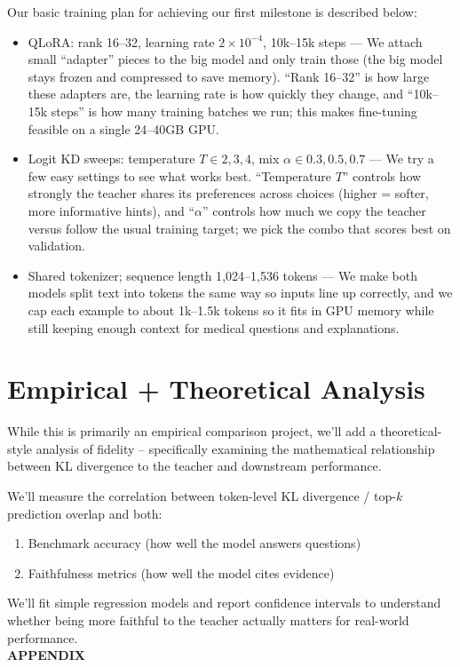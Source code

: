 \documentclass[10pt]{article}
\begin{document}
Our basic training plan for achieving our first milestone is described below:
\begin{itemize}
\item QLoRA: rank 16--32, learning rate $2\times10^{-4}$, 10k--15k steps — We attach small “adapter” pieces to the big model and only train those (the big model stays frozen and compressed to save memory). “Rank 16–32” is how large these adapters are, the learning rate is how quickly they change, and “10k–15k steps” is how many training batches we run; this makes fine-tuning feasible on a single 24–40GB GPU.

\item Logit KD sweeps: temperature $T \in {2,3,4}$, mix $\alpha \in {0.3,0.5,0.7}$ — We try a few easy settings to see what works best. “Temperature $T$” controls how strongly the teacher shares its preferences across choices (higher = softer, more informative hints), and “$\alpha$” controls how much we copy the teacher versus follow the usual training target; we pick the combo that scores best on validation.

\item Shared tokenizer; sequence length 1{,}024--1{,}536 tokens — We make both models split text into tokens the same way so inputs line up correctly, and we cap each example to about 1k–1.5k tokens so it fits in GPU memory while still keeping enough context for medical questions and explanations.
\end{itemize}

\section{Empirical + Theoretical Analysis}

While this is primarily an empirical comparison project, we'll add a theoretical-style analysis of fidelity -- specifically examining the mathematical relationship between KL divergence to the teacher and downstream performance.

We'll measure the correlation between token-level KL divergence / top-$k$ prediction overlap and both:
\begin{enumerate}
    \item Benchmark accuracy (how well the model answers questions)
    \item Faithfulness metrics (how well the model cites evidence)
\end{enumerate}

We'll fit simple regression models and report confidence intervals to understand whether being more faithful to the teacher actually matters for real-world performance.
\\
\newpage
\textbf{APPENDIX}
\\
\end{document}
